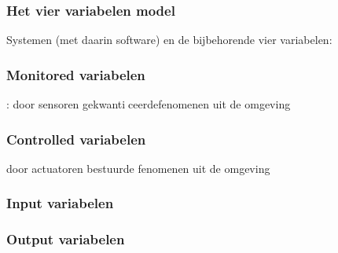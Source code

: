 \subsubsection{Het vier variabelen model}
Systemen (met daarin software) en de bijbehorende vier variabelen:
\subsubsection{Monitored variabelen}
: door sensoren gekwanticeerdefenomenen uit de omgeving
\subsubsection{Controlled variabelen}
door actuatoren bestuurde fenomenen uit de omgeving
\subsubsection{Input variabelen}
\subsubsection{Output variabelen}





